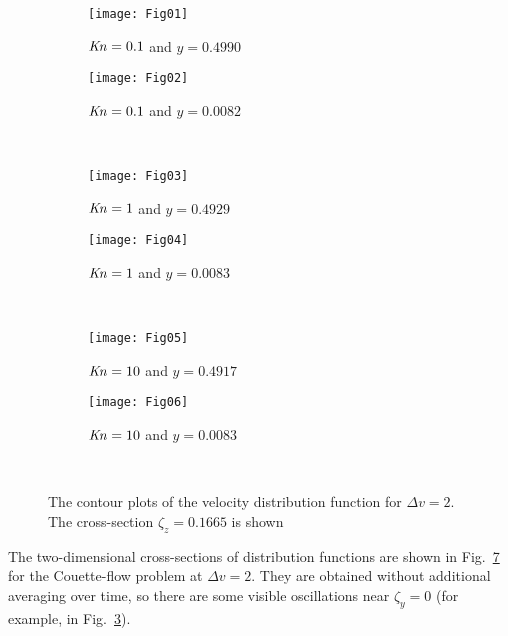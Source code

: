 \documentclass[]{jfm}
\newcommand{\Kn}{\mbox{\textit{Kn}}}
\begin{document}
\begin{figure}
    \vspace{-24pt}
    \centering
    \begin{subfigure}[b]{.5\linewidth}
        \texttt{[image: Fig01]}
        \caption{\(\Kn=0.1\) and \(y=0.4990\)}
        \label{fig:distrib-kn0.1:boundary}
    \end{subfigure}%
    \begin{subfigure}[b]{.5\linewidth}
        \texttt{[image: Fig02]}
        \caption{\(\Kn=0.1\) and \(y=0.0082\)}
        \label{fig:distrib-kn0.1:center}
    \end{subfigure}\\
    \begin{subfigure}[b]{.5\linewidth}
        \texttt{[image: Fig03]}
        \caption{\(\Kn=1\) and \(y=0.4929\)}
        \label{fig:distrib-kn1.0:boundary}
    \end{subfigure}%
    \begin{subfigure}[b]{.5\linewidth}
        \texttt{[image: Fig04]}
        \caption{\(\Kn=1\) and \(y=0.0083\)}
        \label{fig:distrib-kn1.0:center}
    \end{subfigure}\\
    \begin{subfigure}[b]{.5\linewidth}
        \texttt{[image: Fig05]}
        \caption{\(\Kn=10\) and \(y=0.4917\)}
        \label{fig:distrib-kn10:boundary}
    \end{subfigure}%
    \begin{subfigure}[b]{.5\linewidth}
        \texttt{[image: Fig06]}
        \caption{\(\Kn=10\) and \(y=0.0083\)}
        \label{fig:distrib-kn10:center}
    \end{subfigure}\\
    \caption{The contour plots of the velocity distribution function for \(\Delta{v}=2\).
        The cross-section \(\zeta_z=0.1665\) is shown}
    \label{fig:distrib}
\end{figure}

The two-dimensional cross-sections of distribution functions are shown
in Fig.~\ref{fig:distrib} for the Couette-flow problem at \(\Delta{v}=2\).
They are obtained without additional averaging over time,
so there are some visible oscillations near \(\zeta_y=0\)
(for example, in Fig.~\ref{fig:distrib-kn1.0:boundary}).
\end{document}
